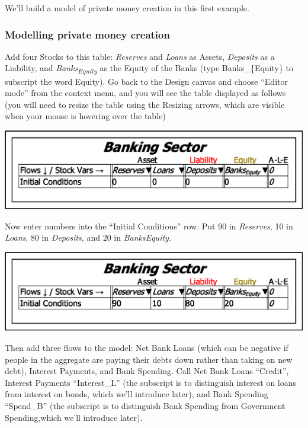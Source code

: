 We'll build a model of private money creation in this first example.

\subsubsection{Modelling private money creation}

Add four Stocks to this table: \emph{Reserves }and \emph{Loans} as
Assets, \emph{Deposits} as a Liability, and \emph{Banks}\textsubscript{\emph{Equity}}
as the Equity of the Banks (type Banks\_\{Equity\} to subscript the
word Equity). Go back to the Design canvas and choose ``Editor mode''
from the context menu, and you will see the table displayed as follows
(you will need to resize the table using the Resizing arrows, which
are visible when your mouse is hovering over the table)

\noindent\includegraphics[width=\textwidth]{images/MonetaryModel01GodleyTable02}

Now enter numbers into the ``Initial Conditions'' row. Put 90 in
\emph{Reserves}, 10 in \emph{Loans}, 80 in \emph{Deposits}, and 20
in \emph{BanksEquity}. 

\noindent\includegraphics[width=\textwidth]{images/MonetaryModel01GodleyTable03InitialConditions}

Then add three flows to the model: Net Bank Loans (which can be negative
if people in the aggregate are paying their debts down rather than
taking on new debt), Interest Payments, and Bank Spending. Call Net
Bank Loans ``Credit'', Interest Payments ``Interest\_L'' (the
subscript is to distinguish interest on loans from interest on bonds,
which we'll introduce later), and Bank Spending ``Spend\_B'' (the
subscript is to distinguish Bank Spending from Government Spending,which
we'll introduce later).

